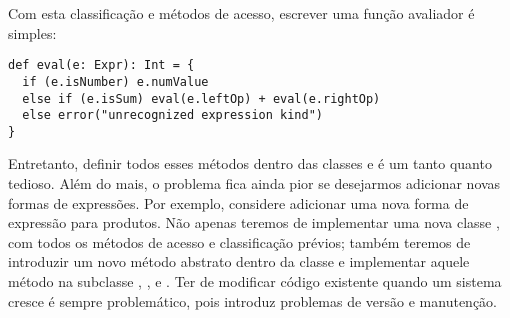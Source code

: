Com esta classifica\c{c}\~{a}o e m\'{e}todos de acesso, escrever uma fun\c{c}\~{a}o avaliador \'{e} simples:
\begin{lstlisting}
def eval(e: Expr): Int = {
  if (e.isNumber) e.numValue
  else if (e.isSum) eval(e.leftOp) + eval(e.rightOp)
  else error("unrecognized expression kind")
}
\end{lstlisting}
Entretanto, definir todos esses m\'{e}todos dentro das classes  e 
\'{e} um tanto quanto tedioso. Al\'{e}m do mais, o problema fica ainda pior se desejarmos 
adicionar novas formas de express\~{o}es. Por exemplo, considere adicionar uma nova 
forma de express\~{a}o  para produtos. N\~{a}o apenas teremos de implementar uma nova classe 
, com todos os m\'{e}todos de acesso e classifica\c{c}\~{a}o pr\'{e}vios; tamb\'{e}m teremos de 
introduzir um novo m\'{e}todo abstrato  dentro da classe  e 
implementar aquele m\'{e}todo na subclasse , , e .
Ter de  modificar c\'{o}digo existente quando um sistema cresce \'{e} sempre problem\'{a}tico, pois
introduz problemas de vers\~{a}o e manuten\c{c}\~{a}o.  

